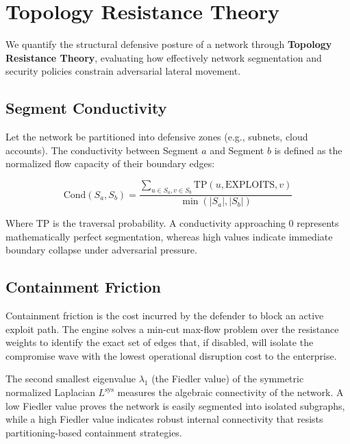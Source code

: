 \documentclass[11pt,a4paper]{article}
\theoremstyle{definition}
\numberwithin{equation}{section}
\begin{document}
\section{Topology Resistance Theory}\label{sec:resistance}

We quantify the structural defensive posture of a network through \textbf{Topology Resistance Theory}, evaluating how effectively network segmentation and security policies constrain adversarial lateral movement.

\subsection{Segment Conductivity}\label{subsec:conductivity}

Let the network be partitioned into defensive zones (e.g., subnets, cloud accounts). The conductivity between Segment $a$ and Segment $b$ is defined as the normalized flow capacity of their boundary edges:

\begin{equation}\label{eq:conductivity}
\text{Cond}(S_a, S_b) = \frac{\displaystyle\sum_{u \in S_a, v \in S_b} \text{TP}(u, \text{EXPLOITS}, v)}{\min(|S_a|, |S_b|)}
\end{equation}

Where $\text{TP}$ is the traversal probability. A conductivity approaching $0$ represents mathematically perfect segmentation, whereas high values indicate immediate boundary collapse under adversarial pressure.

\subsection{Containment Friction}\label{subsec:friction}

Containment friction is the cost incurred by the defender to block an active exploit path. The engine solves a min-cut max-flow problem over the resistance weights to identify the exact set of edges that, if disabled, will isolate the compromise wave with the lowest operational disruption cost to the enterprise.

\begin{graphinsight}
The second smallest eigenvalue $\lambda_1$ (the Fiedler value) of the symmetric normalized Laplacian $L^{\text{sys}}$ measures the algebraic connectivity of the network. A low Fiedler value proves the network is easily segmented into isolated subgraphs, while a high Fiedler value indicates robust internal connectivity that resists partitioning-based containment strategies.
\end{graphinsight}
\end{document}
